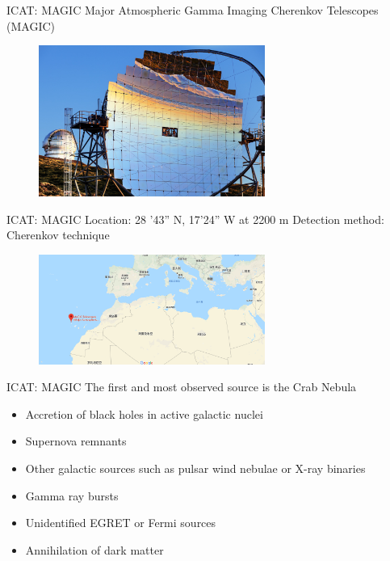 \documentclass{beamer}
\begin{document}
\begin{frame}{ICAT: MAGIC}
    Major Atmospheric Gamma Imaging Cherenkov Telescopes (MAGIC)
    \begin{figure}[h]
        \includegraphics[width=280px]{MAGIC_mirror.jpg}
    \end{figure}
\end{frame}


\begin{frame}{ICAT: MAGIC}
    Location: 28 '43'' N, 17'24'' W at 2200 m
    \newline
    Detection method: Cherenkov technique
    \begin{figure}[h]
        \includegraphics[width=280px]{MAGIC_location.png}
    \end{figure}
\end{frame}

\begin{frame}{ICAT: MAGIC}
    The first and most observed source is the Crab Nebula
    \begin{itemize}
        \item Accretion of black holes in active galactic nuclei
        \item Supernova remnants
        \item Other galactic sources such as pulsar wind nebulae or X-ray binaries
        \item Gamma ray bursts
        \item Unidentified EGRET or Fermi sources
        \item Annihilation of dark matter
    \end{itemize}
\end{frame}
\end{document}
